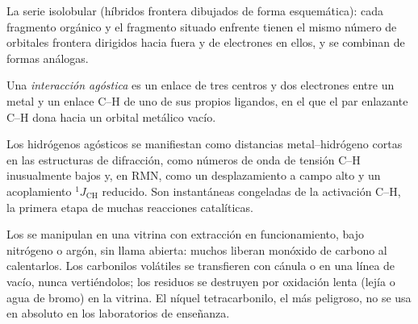 \begin{omfigure}

{\small La serie isolobular (híbridos frontera dibujados de forma esquemática): cada fragmento
orgánico y el fragmento  situado enfrente tienen el mismo número de
orbitales frontera dirigidos hacia fuera y de electrones en ellos, y se combinan de
formas análogas.}
\end{omfigure}

\begin{definition}\label{def:b3:organometallic-bonding:agostic}
Una \emph{interacción agóstica} es un enlace de tres centros
y dos electrones entre un metal y un enlace C--H de uno de sus propios ligandos, en el
que el par enlazante C--H dona hacia un orbital metálico vacío.
\end{definition}

Los hidrógenos agósticos se manifiestan como distancias metal--hidrógeno cortas en las estructuras
de difracción, como números de onda de tensión C--H inusualmente bajos y, en RMN, como un
desplazamiento a campo alto y un acoplamiento $^1J_{\mathrm{CH}}$ reducido. Son instantáneas congeladas de la
activación C--H, la primera etapa de muchas reacciones catalíticas.

\begin{inthelab}
Los  se manipulan en una vitrina con extracción en funcionamiento, bajo
nitrógeno o argón, sin llama abierta: muchos liberan monóxido de carbono al
calentarlos. Los carbonilos volátiles se transfieren con cánula o en una línea de vacío, nunca
vertiéndolos; los residuos se destruyen por oxidación lenta (lejía o agua de bromo) en la
vitrina. El níquel tetracarbonilo, el más peligroso, no se usa en absoluto en los laboratorios
de enseñanza.
\end{inthelab}

